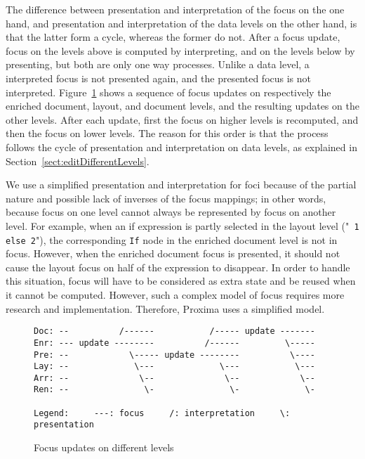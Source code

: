 The difference between presentation and interpretation of the focus on the one hand, and presentation and interpretation of the data levels on the other hand, is that the latter form a cycle, whereas the former do not. After a focus update, focus on the levels above is computed by interpreting, and on the levels below by presenting, but both are only one way processes. Unlike a data level, a interpreted focus is not presented again, and the presented focus is not interpreted. Figure~\ref{focusUpdates} shows a sequence of focus updates on respectively the enriched document, layout, and document levels, and the resulting updates on the other levels. After each update, first the focus on higher levels is recomputed, and then the focus on lower levels. The reason for this order is that the process follows the cycle of presentation and interpretation on data levels, as explained in Section~\ref{sect:editDifferentLevels}.


We use a simplified presentation and interpretation for foci because of  the partial nature and possible lack of inverses of the focus mappings; in other words, because focus on one level cannot always be represented by focus on another level. For example, when an if expression is partly selected in the layout level ("{\tt {}\verb| 1 else 2|}"), the corresponding \verb|If| node in the enriched document level is not in focus. However, when the enriched document focus is presented, it should not cause the layout focus on half of the expression to disappear. In order to handle this situation, focus will have to be considered as extra state and be reused when it cannot be computed. However, such a complex model of focus requires more research and implementation. Therefore, Proxima uses a simplified model.  

\begin{figure}
\begin{small}
\begin{center}
\begin{verbatim}
Doc: --          /------           /----- update -------
Enr: --- update --------          /------         \-----
Pre: --            \----- update --------          \----
Lay: --             \---             \---           \---
Arr: --              \--              \--            \--
Ren: --               \-               \-             \-

Legend:     ---: focus     /: interpretation     \: presentation
\end{verbatim}
\caption{Focus updates on different levels}\label{focusUpdates} 
\end{center}
\end{small}
\end{figure}


